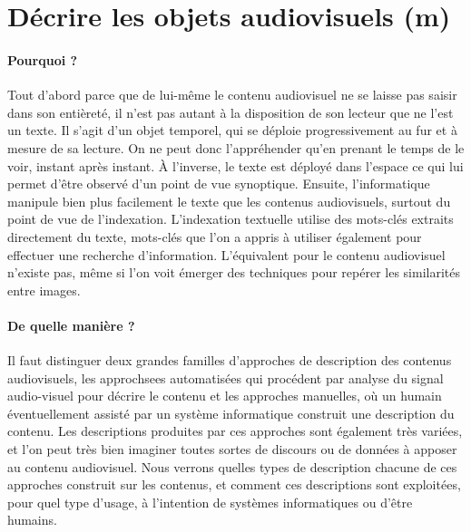 \section{Décrire les objets audiovisuels (m)}\label{s:desc}

\paragraph{Pourquoi ?}
Tout d'abord parce que de lui-même le contenu audiovisuel ne se laisse pas saisir dans son entièreté, il n'est pas autant à la disposition de son lecteur que ne l'est un texte. 
Il s'agit d'un objet temporel, qui se déploie progressivement au fur et à mesure de sa lecture. 
On ne peut donc l'appréhender qu'en prenant le temps de le voir, instant après instant. 
À l'inverse, le texte est déployé dans l'espace ce qui lui permet d'être observé d'un point de vue synoptique. 
Ensuite, l'informatique manipule  bien plus facilement le texte que les contenus audiovisuels, surtout du point de vue de l'indexation. 
L'indexation textuelle utilise des mots-clés extraits directement du texte, mots-clés que l'on a appris à utiliser également pour effectuer une recherche d'information. 
L'équivalent pour le contenu audiovisuel n'existe pas, même si l'on voit émerger des techniques pour repérer les similarités entre images.

\paragraph{De quelle manière ?}
Il faut distinguer deux grandes familles d'approches de description des contenus audiovisuels, les approchsees automatisées qui procédent par analyse du signal audio-visuel pour décrire le contenu et les approches manuelles, où un humain éventuellement assisté par un système informatique construit une description du contenu. 
Les descriptions produites par ces approches sont également très variées, et l'on peut très bien imaginer toutes sortes de discours ou de données à apposer au contenu audiovisuel. 
Nous verrons quelles types de description chacune de ces approches construit sur les contenus, et comment ces descriptions sont exploitées, pour quel type d'usage, à l'intention de systèmes informatiques ou d'être humains.

